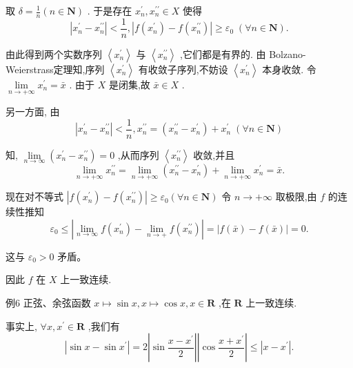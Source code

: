 取 $\delta  = \frac{1}{n}\left( {n \in  \mathbf{N}}\right)$ . 于是存在 ${x}_{n}^{\prime },{x}_{n}^{\prime \prime } \in  X$ 使得
$$\left| {{x}_{n}^{\prime } - {x}_{n}^{\prime \prime }}\right|  < \frac{1}{n},\left| {f\left( {x}_{n}^{\prime }\right)  - f\left( {x}_{n}^{\prime \prime }\right) }\right|  \geq  {\varepsilon }_{0}\;\left( {\forall n \in  \mathbf{N}}\right) .$$

由此得到两个实数序列 $\left\langle  {x}_{n}^{\prime }\right\rangle$ 与 $\left\langle  {x}_{n}^{\prime \prime }\right\rangle$ ,它们都是有界的. 由 Bolzano-Weierstrass定理知,序列 $\left\langle  {x}_{n}^{\prime }\right\rangle$ 有收敛子序列,不妨设 $\left\langle  {x}_{n}^{\prime }\right\rangle$ 本身收敛. 令 $\mathop{\lim }\limits_{{n \rightarrow   + \infty }}{x}_{n}^{\prime } = \bar{x}$ . 由于 $X$ 是闭集,故 $\bar{x} \in  X$ .

另一方面, 由
$$\left| {{x}_{n}^{\prime } - {x}_{n}^{\prime \prime }}\right|  < \frac{1}{n},{x}_{n}^{\prime \prime } = \left( {{x}_{n}^{\prime \prime } - {x}_{n}^{\prime }}\right)  + {x}_{n}^{\prime }\;\left( {\forall n \in  \mathbf{N}}\right)$$

知, $\mathop{\lim }\limits_{{n \rightarrow  \infty }}\left( {{x}_{n}^{\prime } - {x}_{n}^{\prime \prime }}\right)  = 0$ ,从而序列 $\left\langle  {x}_{n}^{\prime \prime }\right\rangle$ 收敛,并且
$$\mathop{\lim }\limits_{{n \rightarrow   + \infty }}{x}_{n}^{\prime \prime } = \mathop{\lim }\limits_{{n \rightarrow   + \infty }}\left( {{x}_{n}^{\prime \prime } - {x}_{n}^{\prime }}\right)  + \mathop{\lim }\limits_{{n \rightarrow   + \infty }}{x}_{n}^{\prime } = \bar{x}.$$

现在对不等式 $\left| {f\left( {x}_{n}^{\prime }\right)  - f\left( {x}_{n}^{\prime \prime }\right) }\right|  \geq  {\varepsilon }_{0}\left( {\forall n \in  \mathbf{N}}\right)$ 令 $n \rightarrow   + \infty$ 取极限,由 $f$ 的连续性推知
$${\varepsilon }_{0} \leq  \left| {\mathop{\lim }\limits_{{n \rightarrow  \infty }}f\left( {x}_{n}^{\prime }\right)  - \mathop{\lim }\limits_{{n \rightarrow   + }}f\left( {x}_{n}^{\prime \prime }\right) }\right|  = \left| {f\left( \bar{x}\right)  - f\left( \bar{x}\right) }\right|  = 0.$$

这与 ${\varepsilon }_{0} > 0$ 矛盾。

因此 $f$ 在 $X$ 上一致连续.

例6 正弦、余弦函数 $x \mapsto  \sin x,x \mapsto  \cos x,x \in  \mathbf{R}$ ,在 $\mathbf{R}$ 上一致连续.

事实上, $\forall x,{x}^{\prime } \in  \mathbf{R}$ ,我们有
$$\left| {\sin x - \sin {x}^{\prime }}\right|  = 2\left| {\sin \frac{x - {x}^{\prime }}{2}}\right| \left| {\cos \frac{x + {x}^{\prime }}{2}}\right|  \leq  \left| {x - {x}^{\prime }}\right| .$$

